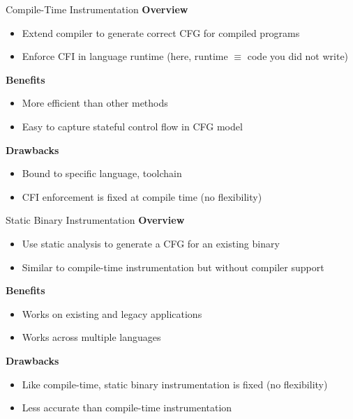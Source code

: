 \documentclass[12pt, dvipsnames, aspectratio=169]{beamer}
\newcommand{\red}[1]{{\color{red}#1}}
\newcommand{\blue}[1]{{\color{blue}#1}}
\begin{document}

\begin{frame}[c]{Compile-Time Instrumentation}{}
  {\bf Overview}
  \begin{itemize}
    \item Extend compiler to generate correct CFG for compiled programs
    \item Enforce CFI in language runtime (here, runtime $\equiv$ code you did not write)
  \end{itemize}

  \vfill
  {\bf \blue{Benefits}}
  \begin{itemize}
    \item More efficient than other methods
    \item Easy to capture stateful control flow in CFG model
  \end{itemize}

  \vfill
  {\bf \red{Drawbacks}}
  \begin{itemize}
    \item Bound to specific language, toolchain
    \item CFI enforcement is fixed at compile time (no flexibility)
  \end{itemize}
\end{frame}

\begin{frame}[c]{Static Binary Instrumentation}{}
  {\bf Overview}
  \begin{itemize}
    \item Use static analysis to generate a CFG for an existing binary
    \item Similar to compile-time instrumentation but without compiler support
  \end{itemize}

  \vfill
  {\bf \blue{Benefits}}
  \begin{itemize}
    \item Works on existing and legacy applications
    \item Works across multiple languages
  \end{itemize}

  \vfill
  {\bf \red{Drawbacks}}
  \begin{itemize}
    \item Like compile-time, static binary instrumentation is fixed (no flexibility)
    \item Less accurate than compile-time instrumentation
  \end{itemize}
\end{frame}
\end{document}
